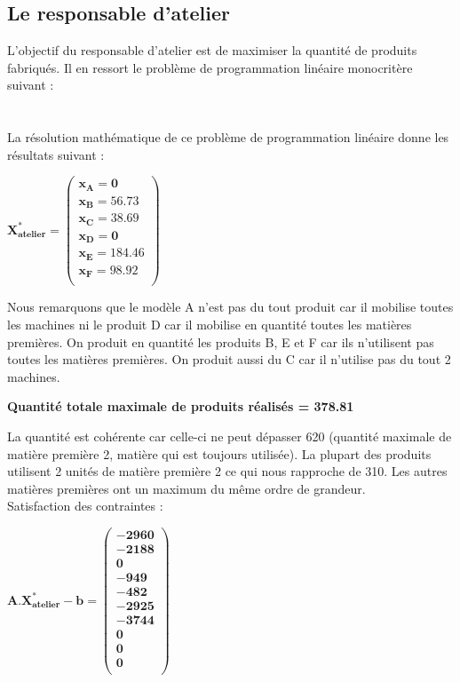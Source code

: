 \documentclass[12pt]{article}
\begin{document}
\subsection{Le responsable d'atelier}
L'objectif du responsable d'atelier est de maximiser la quantité de produits fabriqués. 
Il en ressort le problème de programmation linéaire monocritère suivant : \newline 
\\
\noindent{}
\\
\\
La résolution mathématique de ce problème de programmation linéaire donne les résultats suivant :
\begin{center}
$\mathbf{X^{*}_{atelier} = 
   \left (
   \begin{array}{c}
      x_{A} = 0 \\
      x_{B} = 56.73 \\
      x_{C} = 38.69 \\
      x_{D} = 0 \\
      x_{E} = 184.46 \\
      x_{F} = 98.92 \\
   \end{array}
   \right )
 } $ 
\end{center}
Nous remarquons que le modèle A n'est pas du tout produit car il mobilise toutes les machines ni le produit D car il mobilise en quantité toutes les matières premières. On produit en quantité les produits B, E et F car ils n’utilisent pas toutes les matières premières. On produit aussi du C car il n’utilise pas du tout 2 machines.
\begin{center}
\textbf{Quantité totale maximale de produits réalisés = 378.81}
\end{center}
La quantité est cohérente car celle-ci ne peut dépasser 620 (quantité maximale de matière
première 2, matière qui est toujours utilisée). La plupart des produits utilisent 2 unités de 
matière première 2 ce qui nous rapproche de 310. Les autres matières premières ont un maximum du même ordre de grandeur.
\\
Satisfaction des contraintes :
\begin{center}
$\mathbf{A.X^{*}_{atelier} - b = 
   \left (
   \begin{array}{c}
      -2960 \\
      -2188 \\
      0 \\
      -949 \\
      -482\\
      -2925 \\
      -3744 \\
      0 \\
      0 \\
      0\\
   \end{array}
   \right )
 } $ 
\end{center}
\end{document}
